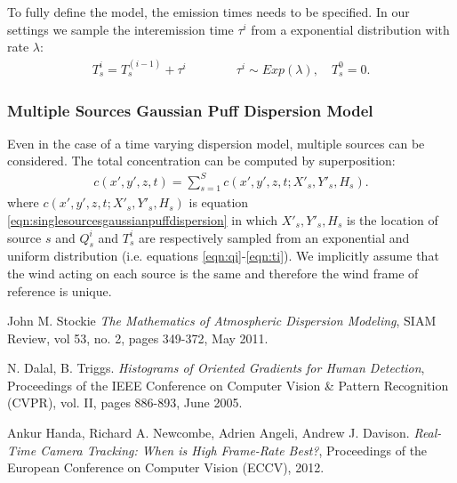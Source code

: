 \documentclass[a4paper,11pt]{report}
\begin{document}
To fully define the model, the emission times needs to be specified. In our settings we sample the interemission time $\tau^i$ from a exponential distribution with rate $\lambda$:
\begin{align}\label{eqn:ti}
T^i_s = T^{(i-1)}_s + \tau^i   \qquad \qquad \tau^i \sim Exp (\lambda), \quad T^0_s = 0.
\end{align}

\subsubsection{Multiple Sources Gaussian Puff Dispersion Model}

Even in the case of a time varying dispersion model, multiple sources can be considered. The total concentration can be computed by superposition:
\begin{align}\label{eqn:multiplesourcesgaussianpuffdispersion}
c(x',y',z,t) = \sum_{s=1}^S c(x',y',z,t;X'_s,Y'_s,H_s).
\end{align}
where $c(x',y',z,t;X'_s,Y'_s,H_s)$ is equation \ref{eqn:singlesourcesgaussianpuffdispersion} in which $X'_s,Y'_s,H_s$ is the location of source $s$ and $Q^i_s$ and $T^i_s$ are respectively sampled from an exponential and uniform distribution (i.e. equations \ref{eqn:qi}-\ref{eqn:ti}).
We implicitly assume that the wind acting on each source is the same and therefore the wind frame of reference is unique.


\begin{thebibliography}{1}

 John M. Stockie {\em The Mathematics of
Atmospheric Dispersion Modeling}, {SIAM} Review, vol 53, no. 2, pages 349-372, May 2011.

 N. Dalal, B. Triggs. {\em Histograms of Oriented Gradients for Human Detection}, Proceedings of the {IEEE} Conference on Computer Vision \& Pattern Recognition (CVPR), vol. II, pages 886-893, June 2005.

 Ankur Handa, Richard A. Newcombe, Adrien Angeli, Andrew J. Davison. {\em Real-Time Camera Tracking: When is High Frame-Rate Best?}, Proceedings of the European Conference on Computer Vision (ECCV), 2012.

\end{thebibliography}
  
\end{document}
